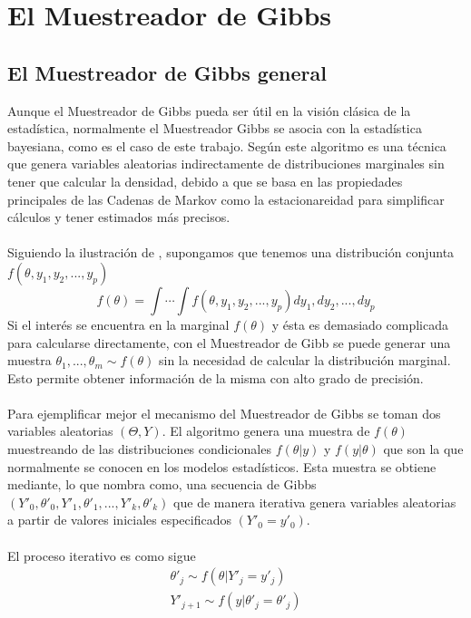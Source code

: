 \section{El Muestreador de Gibbs}
\subsection{El Muestreador de Gibbs general}
Aunque el Muestreador de Gibbs pueda ser \'util en la visi\'on cl\'asica de la estad\'istica, normalmente el Muestreador Gibbs se asocia con la estad\'istica bayesiana, como es el caso de este trabajo. Seg\'un \cite{casella1992explaining} este algoritmo es una t\'ecnica que genera variables aleatorias indirectamente de distribuciones marginales sin tener que calcular la densidad, debido a que se basa en las propiedades principales de las Cadenas de Markov como la estacionareidad para simplificar c\'alculos y tener estimados m\'as precisos.\\
\\
Siguiendo la ilustraci\'on de \cite{casella1992explaining}, supongamos que tenemos una distribuci\'on conjunta $f(\theta,y_1,y_2,...,y_p)$\\
\[f(\theta)=\int \cdots \int f(\theta,y_1,y_2,...,y_p) dy_1,dy_2,...,dy_p\]
Si el inter\'es se encuentra en la marginal $f(\theta)$ y \'esta es demasiado complicada para calcularse directamente, con el Muestreador de Gibb se puede generar una muestra $\theta_1,...,\theta_m \sim f(\theta)$ sin la necesidad de calcular la distribuci\'on marginal. Esto permite obtener informaci\'on de la misma con alto grado de precisi\'on.\\
\\
Para ejemplificar mejor el mecanismo del Muestreador de Gibbs se toman dos variables aleatorias $(\Theta,Y)$. El algoritmo genera una muestra de $f(\theta)$ muestreando de las distribuciones condicionales $f(\theta|y)$ y $f(y|\theta)$ que son la que normalmente se conocen en los modelos estad\'isticos. Esta muestra se obtiene mediante, lo que \cite{casella1992explaining} nombra como, una secuencia de Gibbs $(Y'_0,\theta'_0,Y'_1,\theta'_1,...,Y'_k,\theta'_k)$ que de manera iterativa genera variables aleatorias a partir de valores iniciales especificados $(Y'_0=y'_0)$.\\
\\El proceso iterativo es como sigue\\
\begin{align*}
\theta'_j \sim f(\theta|Y'_j=y'_j)\\
Y'_{j+1} \sim f(y|\theta'_j=\theta'_j)
\end{align*}
